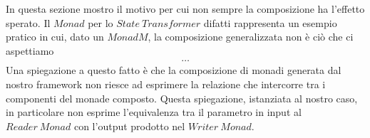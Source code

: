 \label{state_transformer}

In questa sezione mostro il motivo per cui non sempre la composizione ha
l'effetto sperato.
Il $Monad$ per lo $State\ Transformer$ difatti rappresenta un esempio pratico
in cui, dato un $Monad M$, la composizione generalizzata non è ciò che ci
aspettiamo
\begin{align*}
  \dots
\end{align*}
Una spiegazione a questo fatto è che la composizione di monadi generata dal
nostro framework non riesce ad esprimere la relazione che intercorre tra i
componenti del monade composto.
Questa spiegazione, istanziata al nostro caso, in particolare non esprime
l'equivalenza tra il parametro in input al $Reader\ Monad$ con l'output prodotto
nel $Writer\ Monad$.\newline

